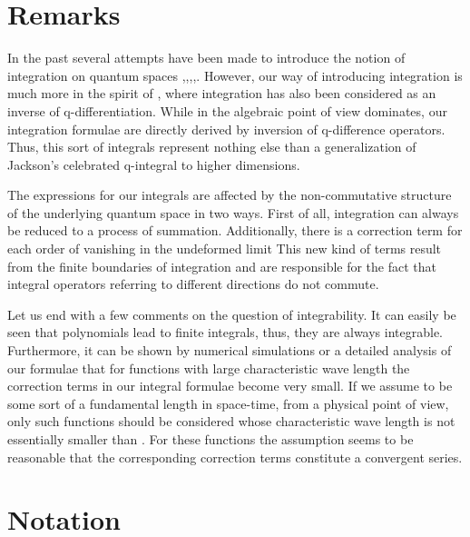\documentclass[a4paper,11pt,oneside]{article}
\begin{document}
\section{Remarks}

In the past several attempts have been made to introduce the notion of
integration on quantum spaces \cite{Ste96},\cite{CZ93},\cite{Fio93},\cite
{HW92},\cite{Die01}. However, our way of introducing integration is much
more in the spirit of \cite{KM94}, where integration has also been
considered as an inverse of q-differentiation. While in \cite{KM94} the
algebraic point of view dominates, our integration formulae are directly
derived by inversion of q-difference operators. Thus, this sort of integrals
represent nothing else than a generalization of Jackson's celebrated
q-integral to higher dimensions.

The expressions for our integrals are affected by the non-commutative
structure of the underlying quantum space in two ways. First of all,
integration can always be reduced to a process of summation. Additionally,
there is a correction term for each order of \myHighlight{$\lambda $}\coordHE{} vanishing in the
undeformed limit \coordHE{} This new kind of terms result from the finite
boundaries of integration and are responsible for the fact that integral
operators referring to different directions do not commute.

Let us end with a few comments on the question of integrability. It can
easily be seen that polynomials lead to finite integrals, thus, they are
always integrable. Furthermore, it can be shown by numerical simulations or
a detailed analysis of our formulae that for functions with large 
characteristic wave length the correction
terms in our integral formulae become very small. If we assume \myHighlight{$\lambda $}\coordHE{}
to be some sort of a fundamental length in space-time, from a physical point
of view, only such functions should be considered whose characteristic
wave length is not essentially smaller than \myHighlight{$\lambda $}\coordHE{}. For these functions
the assumption seems to be reasonable that the corresponding correction
terms constitute a convergent series.

\appendix 

\section{Notation\label{AppA}}
\end{document}
